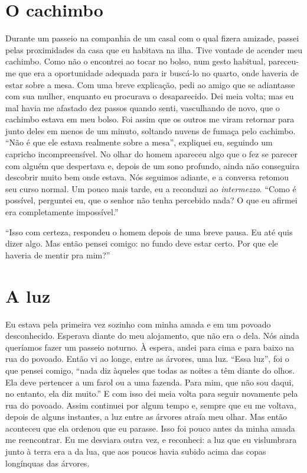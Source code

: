 \section{O cachimbo}

Durante um passeio na companhia de um casal com o qual fizera amizade,
passei pelas proximidades da casa que eu habitava na ilha. Tive vontade
de acender meu cachimbo. Como não o encontrei ao tocar no bolso, num
gesto habitual, pareceu-me que era a oportunidade adequada para ir
buscá-lo no quarto, onde haveria de estar sobre a mesa. Com uma breve
explicação, pedi ao amigo que se adiantasse com sua mulher, enquanto eu
procurava o desaparecido. Dei meia volta; mas eu mal havia me afastado
dez passos quando senti, vasculhando de novo, que o cachimbo estava em
meu bolso. Foi assim que os outros me viram retornar para junto deles em
menos de um minuto, soltando nuvens de fumaça pelo cachimbo. ``Não é que
ele estava realmente sobre a mesa'', expliquei eu, seguindo um capricho
incompreensível. No olhar do homem apareceu algo que o fez se parecer
com alguém que despertava e, depois de um sono profundo, ainda não
conseguira descobrir muito bem onde estava. Nós seguimos adiante, e a
conversa retomou seu curso normal. Um pouco mais tarde, eu a reconduzi
ao \emph{intermezzo}. ``Como é possível, perguntei eu, que o senhor não
tenha percebido nada? O que eu afirmei era completamente impossível.''

``Isso com certeza, respondeu o homem depois de uma breve pausa. Eu até
quis dizer algo. Mas então pensei comigo: no fundo deve estar certo. Por
que ele haveria de mentir pra mim?''

\section{A luz }

Eu estava pela primeira vez sozinho com minha amada e em um povoado
desconhecido. Esperava diante do meu alojamento, que não era o dela. Nós
ainda queríamos fazer um passeio noturno. À espera, andei para cima e
para baixo na rua do povoado. Então vi ao longe, entre as árvores, uma
luz. ``Essa luz'', foi o que pensei comigo, ``nada diz àqueles que todas
as noites a têm diante do olhos. Ela deve pertencer a um farol ou a uma
fazenda. Para mim, que não sou daqui, no entanto, ela diz muito.'' E com
isso dei meia volta para seguir novamente pela rua do povoado. Assim
continuei por algum tempo e, sempre que eu me voltava, depois de alguns
instantes, a luz entre as árvores atraía meu olhar. Mas então aconteceu
que ela ordenou que eu parasse. Isso foi pouco antes da minha amada me
reencontrar. Eu me desviara outra vez, e reconheci: a luz que eu
vislumbrara junto à terra era a da lua, que aos poucos havia subido
acima das copas longínquas das árvores.

